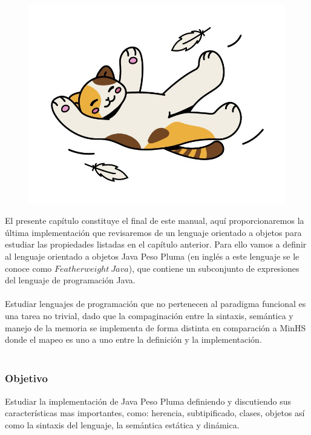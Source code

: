 
\begin{figure}[htbp]
    \centerline{\includegraphics[scale=.4]{assets/11_gatito_cayendo.jpg}}
\end{figure} 
\bigskip

El presente capítulo constituye el final de este manual, aquí proporcionaremos la última implementación que revisaremos de un lenguaje orientado a objetos para estudiar las propiedades listadas en el capítulo anterior.
Para ello vamos a definir al lenguaje orientado a objetos \textsf{Java Peso Pluma} (en inglés a este lenguaje se le conoce como $Featherweight\ Java$), que contiene un subconjunto de expresiones del lenguaje de programación \textsf{Java}.\\\\
Estudiar lenguajes de programación que no pertenecen al paradigma funcional es una tarea no trivial, dado que la compaginación entre la sintaxis, semántica y manejo de la memoria se implementa de forma distinta en comparación a \textsf{MinHS} donde el mapeo es uno a uno entre la definición y la implementación.\\\\

\subsubsection{Objetivo}
Estudiar la implementación de \textsf{Java Peso Pluma} definiendo y discutiendo sus características mas importantes, como: herencia, subtipificado, clases, objetos así como la sintaxis del lenguaje, la semántica estática y dinámica.\\

